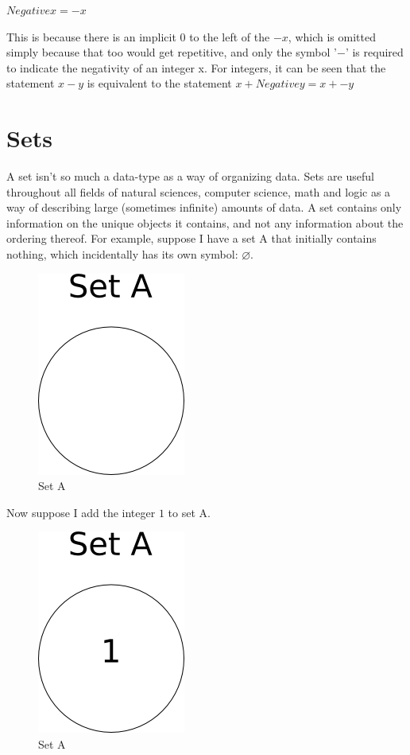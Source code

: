 \begin{center}
$Negative x = -x$
\end{center}
This is because there is an implicit $0$ to the left of the $-x$, which is omitted simply because that too would get repetitive, and only the symbol '$-$' is required to indicate the negativity of an integer x. For integers, it can be seen that the statement $x-y$ is equivalent to the statement $x+Negative y = x+ -y$

\section{Sets}
A set isn't so much a data-type as a way of organizing data. Sets are useful throughout all fields of natural sciences, computer science, math and logic as a way of describing large (sometimes infinite) amounts of data. A set contains only information on the unique objects it contains, and not any information about the ordering thereof. For example, suppose I have a set A that initially contains nothing, which incidentally has its own symbol: $\varnothing$.
\begin{center}
\begin{figure}[h]
\caption{Set A} \label{fig:setAEmpty}
\includegraphics[scale=0.5]{figures/setAEmpty.png}
\end{figure}
\end{center}

Now suppose I add the integer $1$ to set A.
\begin{center}
\begin{figure}[h]
\caption{Set A} \label{fig:setA1}
\includegraphics[scale=0.5]{figures/setA1.png}
\end{figure}
\end{center}


